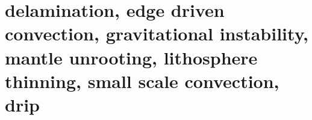 
\section{delamination, edge driven convection, gravitational instability, 
mantle unrooting, lithosphere thinning, small scale convection, drip} 

